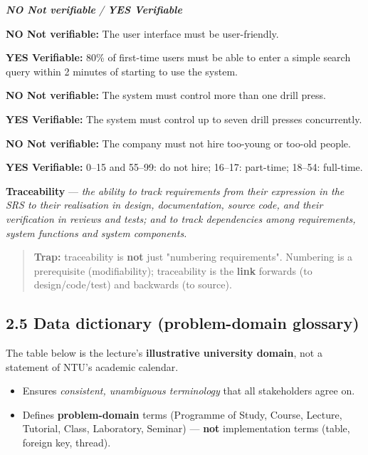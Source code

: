 \begin{studycolumns}
\begin{referenceentries}
\textit{\textbf{NO Not verifiable} / \textbf{YES Verifiable}}\par\smallskip
\noindent \textbf{NO Not verifiable:} The user interface must be user-friendly.\par
\noindent \textbf{YES Verifiable:} 80\% of first-time users must be able to enter a simple search query within 2 minutes of starting to use the system.\par\smallskip
\noindent \textbf{NO Not verifiable:} The system must control more than one drill press.\par
\noindent \textbf{YES Verifiable:} The system must control up to seven drill presses concurrently.\par\smallskip
\noindent \textbf{NO Not verifiable:} The company must not hire too-young or too-old people.\par
\noindent \textbf{YES Verifiable:} 0--15 and 55--99: do not hire; 16--17: part-time; 18--54: full-time.\par\smallskip
\end{referenceentries}
\textbf{Traceability} --- \emph{the ability to track requirements from their expression in the SRS to their realisation in design, documentation, source code, and their verification in reviews and tests; and to track dependencies among requirements, system functions and system components.}


\begin{quote}\small\color{navy}
\textbf{Trap:} traceability is \textbf{not} just "numbering requirements". Numbering is a prerequisite (modifiability); traceability is the \textbf{link} forwards (to design/\allowbreak{}code/\allowbreak{}test) and backwards (to source).

\end{quote}
\subsection*{2.5 Data dictionary (problem-domain glossary)}
The table below is the lecture's \textbf{illustrative university domain}, not a statement of NTU's academic calendar.

\begin{itemize}
\item Ensures \emph{consistent, unambiguous terminology} that all stakeholders agree on.
\item Defines \textbf{problem-domain} terms (Programme of Study, Course, Lecture, Tutorial, Class, Laboratory, Seminar) --- \textbf{not} implementation terms (table, foreign key, thread).
\end{itemize}


\end{studycolumns}
